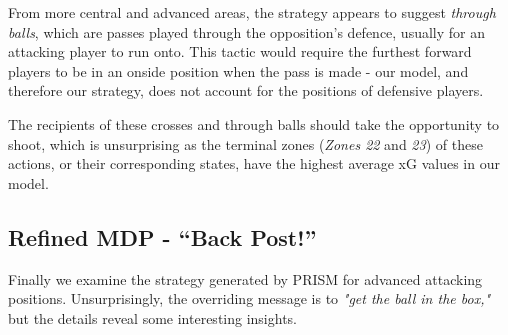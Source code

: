 \documentclass{l4proj}
\begin{document}
From more central and advanced areas, the strategy appears to suggest \textit{through balls}, which are passes played through the opposition's defence, usually for an attacking player to run onto. This tactic would require the furthest forward players to be in an onside position when the pass is made - our model, and therefore our strategy, does not account for the positions of defensive players.

The recipients of these crosses and through balls should take the opportunity to shoot, which is unsurprising as the terminal zones (\textit{Zones 22} and \textit{23}) of these actions, or their corresponding states, have the highest average xG values in our model.

\subsection{Refined MDP - ``Back Post!''}

Finally we examine the strategy generated by PRISM for advanced attacking positions. Unsurprisingly, the overriding message is to \textit{"get the ball in the box,"} but the details reveal some interesting insights.
\end{document}
